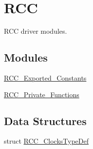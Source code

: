 \hypertarget{group___r_c_c}{\section{R\-C\-C}
\label{group___r_c_c}
}


R\-C\-C driver modules.  


\subsection*{Modules}
\begin{DoxyCompactItemize}
\item 
\hyperlink{group___r_c_c___exported___constants}{R\-C\-C\-\_\-\-Exported\-\_\-\-Constants}
\item 
\hyperlink{group___r_c_c___private___functions}{R\-C\-C\-\_\-\-Private\-\_\-\-Functions}
\end{DoxyCompactItemize}
\subsection*{Data Structures}
\begin{DoxyCompactItemize}
\item 
struct \hyperlink{struct_r_c_c___clocks_type_def}{R\-C\-C\-\_\-\-Clocks\-Type\-Def}
\end{DoxyCompactItemize}

